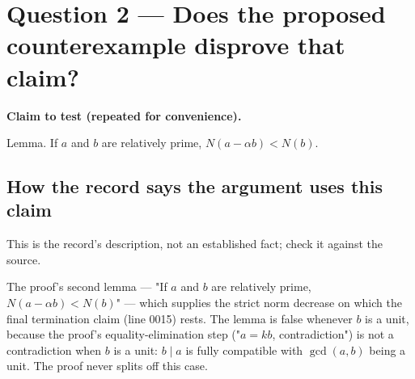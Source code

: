 \documentclass[11pt]{article}
\begin{document}
\section*{Question 2 --- Does the proposed counterexample disprove that claim?}
\textbf{Claim to test (repeated for convenience).}
\begin{Vsrc}
Lemma. If $a$ and $b$ are relatively prime, $N(a-\alpha b)\lt N(b)$.
\end{Vsrc}
\subsection*{How the record says the argument uses this claim}
This is the record's description, not an established fact; check it against the source.
\begin{Vsrc}
The proof's second lemma — "If $a$ and $b$ are relatively prime, $N(a-\alpha b)\lt N(b)$" — which supplies the strict norm decrease on which the final termination claim (line 0015) rests. The lemma is false whenever $b$ is a unit, because the proof's equality-elimination step ("$a=kb$, contradiction") is not a contradiction when $b$ is a unit: $b\mid a$ is fully compatible with $\gcd(a,b)$ being a unit. The proof never splits off this case.
\end{Vsrc}
\end{document}
